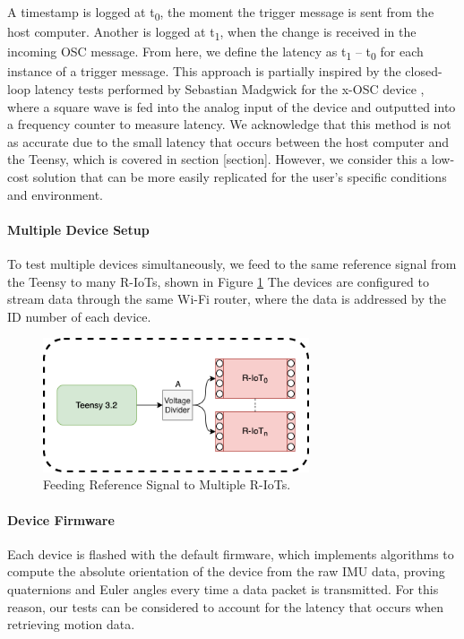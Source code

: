 A timestamp is logged at t\textsubscript{0}, the moment the trigger message is sent from the host computer. Another is logged at t\textsubscript{1}, when the change is received in the incoming OSC message. From here, we define the latency as t\textsubscript{1} – t\textsubscript{0} for each instance of a trigger message. This approach is partially inspired by the closed-loop latency tests performed by Sebastian Madgwick for the x-OSC device \cite{madgwick_x-osc_2013}, where a square wave is fed into the analog input of the device and outputted into a frequency counter to measure latency. We acknowledge that this method is not as accurate due to the small latency that occurs between the host computer and the Teensy, which is covered in section [section]. However, we consider this a low-cost solution that can be more easily replicated for the user’s specific conditions and environment.

\paragraph{Multiple Device Setup}
To test multiple devices simultaneously, we feed to the same reference signal from the Teensy to many R-IoTs, shown in Figure \ref{fig:latency_fig2} The devices are configured to stream data through the same Wi-Fi router, where the data is addressed by the ID number of each device.

\begin{figure}[htbp]
  \centering
    \includegraphics[width=0.7\textwidth]{Chapters/Figures/technical/Latency/figure2.png}
    \caption{Feeding Reference Signal to Multiple R-IoTs.}
    \label{fig:latency_fig2}
\end{figure}

\paragraph{Device Firmware}
Each device is flashed with the default firmware, which implements algorithms to compute the absolute orientation of the device from the raw IMU data, proving quaternions and Euler angles every time a data packet is transmitted. For this reason, our tests can be considered to account for the latency that occurs when retrieving motion data.

